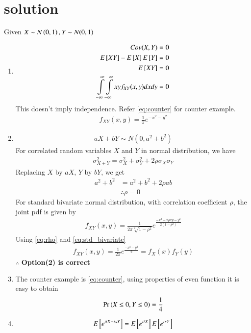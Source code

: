 \documentclass[journal,12pt,twocolumn]{IEEEtran}
\begin{document}
\section{solution}
Given $X\sim N\left(0,1\right), Y\sim N(0,1)$
\begin{enumerate}
\item
\begin{align}
Cov(X,Y)=0\\
E{}\left[XY\right]-E{}\left[X\right]E{}\left[Y\right]=0\\
E{}\left[XY\right]=0\\
\displaystyle \int\limits_{-\infty}^{\infty} \int\limits_{-\infty}^{\infty}xyf_{XY}(x,y) dxdy=0
\end{align}
This doesn't imply independence. Refer \eqref{eq:counter} for counter example.
\begin{align}
f_{XY}(x,y)=\frac{1}{\pi}e^{-x^2-y^2} \label{eq:counter}
\end{align}
\item
\begin{align}
aX+bY\sim N(0,a^2+b^2)
\end{align}
For correlated random variables $X$ and $Y$ in normal distribution, we have
\begin{align}
\sigma_{X+Y}^2=\sigma_X^2+\sigma_Y^2+2\rho\sigma_X\sigma_Y
\end{align}
Replacing $X$ by $aX$, $Y$ by $bY$, we get
\begin{align}
a^2+b^2&=a^2+b^2+2\rho ab\\
&\therefore \rho=0\label{eq:rho}
\end{align}
For standard bivariate normal distribution, with correlation coefficient $\rho$, the joint pdf is given by
\begin{align}
f_{XY}(x,y)=\frac{1}{2\pi\sqrt[2]{1-\rho^2}}e^{\frac{-x^2-2\rho xy-y^2}{2(1-p^2)}}\label{eq:std_bivariate}
\end{align}
Using \eqref{eq:rho} and \eqref{eq:std_bivariate}
\begin{align}
f_{XY}(x,y)=\frac{1}{2\pi}e^{\frac{-x^2-y^2}{2}}=f_X(x)f_Y(y)
\end{align}
$\therefore$ \textbf{Option(2) is correct}
\item
The counter example is \eqref{eq:counter}, using properties of even function it is easy to obtain
\begin{align}
\Pr\left(X\le 0, Y\le0\right)=\frac{1}{4}
\end{align}
\item
\begin{align}
E\sbrak{e^{itX+isY}}=E\sbrak{e^{itX}}E\sbrak{e^{isY}}\\

\end{align}
\end{enumerate}
\end{document}
